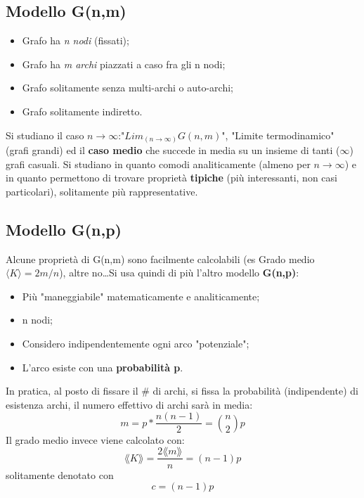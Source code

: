 \documentclass{article}
\begin{document}
    \subsection{Modello G(n,m)}
      \begin{itemize}
        \item Grafo ha \textit{n nodi} (fissati); 
        \item Grafo ha \textit{m archi} piazzati a caso fra gli n nodi;
        \item Grafo solitamente senza multi-archi o auto-archi;
        \item Grafo solitamente indiretto. 
      \end{itemize}
      Si studiano il caso $n\rightarrow\infty$:"$Lim_(n\rightarrow\infty)G(n,m)$", "Limite termodinamico" (grafi grandi) ed il \textbf{caso medio} che succede in media su un insieme di tanti ($\infty$) grafi casuali. Si studiano in quanto comodi analiticamente (almeno per $n\rightarrow\infty$) e in quanto permettono di trovare proprietà \textbf{tipiche} (più interessanti, non casi particolari), solitamente più rappresentative. 
    \subsection{Modello G(n,p)}
      Alcune proprietà di G(n,m) sono facilmente calcolabili (es Grado medio $\langle K\rangle = 2m / n$), altre no\dots Si usa quindi di più l'altro modello \textbf{G(n,p)}:
      \begin{itemize}
        \item Più "maneggiabile" matematicamente e analiticamente;
        \item n nodi;
        \item Considero indipendentemente ogni arco "potenziale"; 
        \item L'arco esiste con una \textbf{probabilità p}.
      \end{itemize}
      In pratica, al posto di fissare il # di archi, si fissa la probabilità (indipendente) di esistenza archi, il numero effettivo di archi sarà in media: $$m=p*\frac{n(n-1)}{2}=\binom{n}{2}p$$ Il grado medio invece viene calcolato con: $$\lang K\rang=\frac{2\lang m\rang}{n}=(n-1)p$$ solitamente denotato con $$c=(n-1)p$$
      \subsection{}
\end{document}
